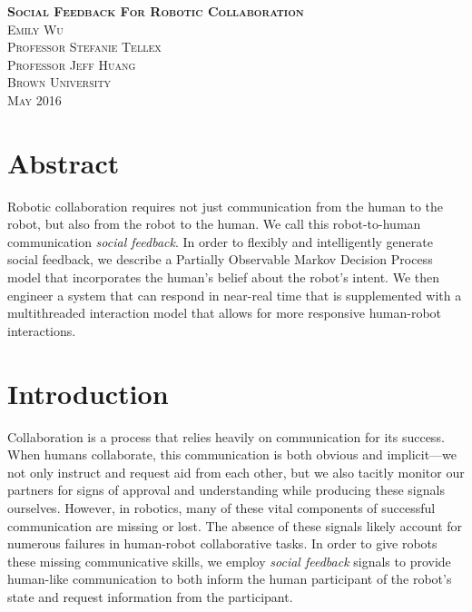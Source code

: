 \documentclass{article}
\begin{document}

\vspace*{8cm}

\begin{raggedleft}
	\scshape
	\huge \textbf{Social Feedback For Robotic Collaboration} \\
	\vspace{0.3cm}
	\Large 
	Emily Wu  \\
	Professor Stefanie Tellex \\
	Professor Jeff Huang \\
	Brown University \\
	May 2016 \\
\end{raggedleft}

\newpage



\vspace*{\fill}
\section*{Abstract}
Robotic collaboration requires not just communication from the human to the robot, but also from the robot to the human. We call this robot-to-human communication \emph{social feedback}. In order to flexibly and intelligently generate social feedback, we describe a Partially Observable Markov Decision Process model that incorporates the human's belief about the robot's intent. We then engineer a system that can respond in near-real time that is supplemented with a multithreaded interaction model that allows for more responsive human-robot interactions. 
\vspace*{\fill}
\newpage
\tableofcontents
\newpage
{} 

\section{Introduction}

Collaboration is a process that relies heavily on communication for its success. When humans collaborate, this communication is both obvious and implicit---we not only instruct and request aid from each other, but we also tacitly monitor our partners for signs of approval and understanding while producing these signals ourselves. However, in robotics, many of these vital components of successful communication are missing or lost. The absence of these signals likely account for numerous failures in human-robot collaborative tasks. In order to give robots these missing communicative skills, we employ \emph{social feedback} signals to provide human-like communication to both inform the human participant of the robot's state and request information from the participant. 
\end{document}
